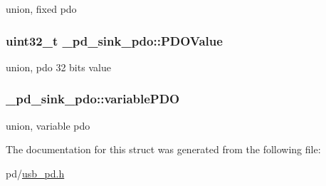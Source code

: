 union, fixed pdo \hypertarget{struct__pd__sink__pdo_a2f3c5aa6d559d35227af11db28c5dac8}{
\subsubsection[{P\-D\-O\-Value}]{\setlength{\rightskip}{0pt plus 5cm}uint32\-\_\-t \-\_\-pd\-\_\-sink\-\_\-pdo\-::\-P\-D\-O\-Value}}\label{struct__pd__sink__pdo_a2f3c5aa6d559d35227af11db28c5dac8}
union, pdo 32 bits value \hypertarget{struct__pd__sink__pdo_a15603e339ec84b653f83ee6865c1dfd8}{
\subsubsection[{variable\-P\-D\-O}]{ \-\_\-pd\-\_\-sink\-\_\-pdo\-::variable\-P\-D\-O}}\label{struct__pd__sink__pdo_a15603e339ec84b653f83ee6865c1dfd8}
union, variable pdo 

The documentation for this struct was generated from the following file\-:\begin{DoxyCompactItemize}
\item 
pd/\hyperlink{usb__pd_8h}{usb\-\_\-pd.\-h}\end{DoxyCompactItemize}

